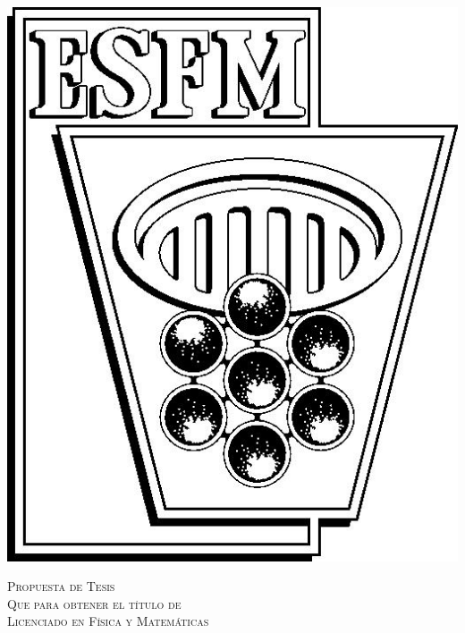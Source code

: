 \begin{center}
\begin{minipage}{0.1\textwidth}
        \centering
        \includegraphics[width=\textwidth]{img/esfm.jpg}
    \end{minipage}
    \begin{center}
    \end{center}
\end{center}

\vfill

\begin{center}
\end{center}

\vspace{20pt}

\begin{center}
    \begin{minipage}{0.7\textwidth}
        \centering
        {\Large\textsc{Propuesta de Tesis}} \\
        {\normalsize\textsc{Que para obtener el título de}} \\
        {\normalsize\textsc{Licenciado en Física y Matemáticas}}
        \medskip
    \end{minipage}
\end{center}

